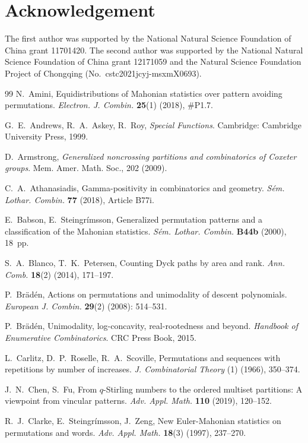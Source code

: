 \documentclass[12pt]{amsart}
\numberwithin{equation}{section}
\theoremstyle{plain}
\theoremstyle{definition}
\begin{document}
\section*{Acknowledgement}
The first author was supported by
the National Natural Science Foundation of China grant 11701420. The second author was supported by the National Natural Science Foundation of China grant 12171059 and the Natural Science Foundation Project of Chongqing (No.~cstc2021jcyj-msxmX0693).


\begin{thebibliography}{99}
N.~Amini, Equidistributions of Mahonian statistics over pattern avoiding permutations. {\it Electron. J. Combin.} {\bf 25}(1) (2018), \#P1.7.

G.~E.~Andrews, R.~A.~Askey, R.~Roy, {\it Special Functions}. Cambridge: Cambridge University Press, 1999.

D.~Armstrong, {\it Generalized noncrossing partitions and combinatorics of Coxeter groups}. Mem. Amer. Math. Soc., 202 (2009).

 C.~A.~Athanasiadis, Gamma-positivity in combinatorics and geometry. {\it S\'{e}m. Lothar. Combin.} {\bf 77} (2018), Article B77i.

E.~Babson, E.~Steingr\'{i}msson, Generalized permutation patterns and a classification of the Mahonian statistics. {\it S\'{e}m. Lothar. Combin.} {\bf B44b} (2000), 18~pp.

S.~A.~Blanco, T.~K.~Petersen, Counting Dyck paths by area and rank. {\it Ann. Comb.} {\bf 18}(2) (2014), 171--197.

P.~Br\"ad\'en, Actions on permutations and unimodality of descent polynomials. {\it European J. Combin.} {\bf 29}(2) (2008): 514--531.

P.~Br\"ad\'en, Unimodality, log-concavity, real-rootedness and beyond. {\it Handbook of Enumerative Combinatorics}. CRC Press Book, 2015.

L.~Carlitz, D.~P.~Roselle, R.~A.~Scoville, Permutations and sequences with repetitions by number of increases. {\it J. Combinatorial Theory} (1) (1966), 350--374.

J.~N.~Chen, S.~Fu, From $q$-Stirling numbers to the ordered multiset partitions: A viewpoint from vincular patterns. {\it Adv. Appl. Math.} {\bf 110} (2019), 120--152.

R.~J.~Clarke, E.~Steingr\'{i}msson, J.~Zeng, New Euler-Mahonian statistics on permutations and words. \textit{Adv. Appl. Math.} {\bf 18}(3) (1997), 237--270.


\end{thebibliography}
\end{document}
